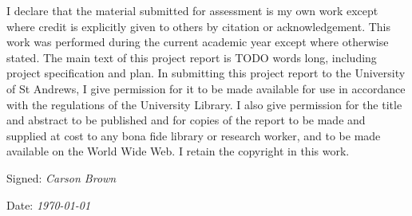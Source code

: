 \documentclass[
11pt, %
oneside, %
english, %
singlespacing, %
liststotoc, %
toctotoc, %
parskip, %
headsepline, %
]{MastersDoctoralThesis} %
\begin{document}
\begin{declaration}
I declare that the material submitted for assessment is my own work except where credit is explicitly given to others by citation or acknowledgement. This work was performed during the current academic year except where otherwise stated. The main text of this project report is TODO words long, including project specification and plan. In submitting this project report to the University of St Andrews, I give permission for it to be made available for use in accordance with the regulations of the University Library. I also give permission for the title and abstract to be published and for copies of the report to be made and supplied at cost to any bona fide library or research worker, and to be made available on the World Wide Web. I retain the copyright in this work.

\noindent Signed: \textit{Carson Brown}

\noindent Date: \textit{\today}
\end{declaration}


%
%

%

%


\tableofcontents %

\listoffigures %


\end{document}

